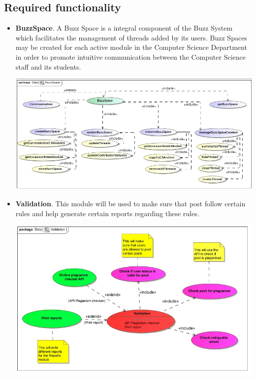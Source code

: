 \documentclass[a4paper,12pt]{report}
\begin{document}
\subsection{Required functionality}
\begin{itemize}
\newpage
	\item \textbf{BuzzSpace}. A Buzz Space is a integral component of the Buzz System which facilitates the management of threads added by its users. Buzz Spaces may be created for each active module in the Computer Science Department in order to promote intuitive communication between the Computer Science staff and its students.	
		\begin{center}
  	 	\includegraphics[width=1\textwidth] {../Lelethu/UseCase_BuzzSpace.jpg}\\[0.4cm]    
		\end{center}
\newpage
\item \textbf{Validation}. This module will be used to make sure that post follow certain rules and help generate certain reports regarding these rules.
		\begin{center}
  	 	\includegraphics[width=1\textwidth] {../Chris/Validation.jpg}\\[0.4cm]    

\end{center}
\end{itemize}
\end{document}
